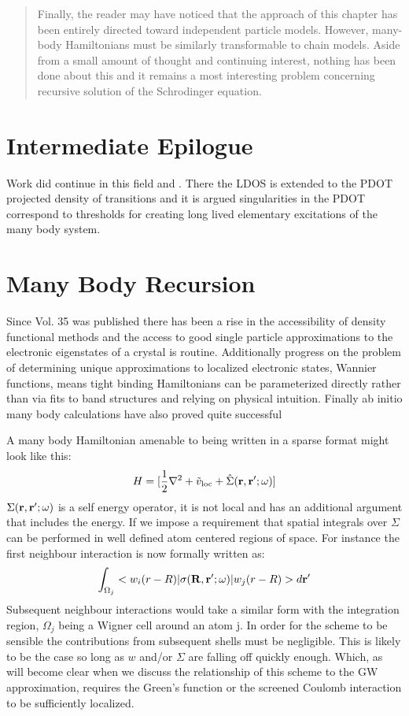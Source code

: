 \documentclass{article}
\def\r{{\bf r}}
\def\R{{\bf R}}
\begin{document}
\begin{quote}
Finally, the reader may have noticed that the approach of this chapter has been entirely directed
toward independent particle models. However, many-body Hamiltonians must be similarly 
transformable to chain models. Aside from a small amount of thought and continuing interest, 
nothing has been done about this and it remains a most interesting problem concerning recursive 
solution of the Schrodinger equation.
\end{quote}

\section{Intermediate Epilogue}
Work did continue in this field and \cite{annett94}. There the LDOS is extended
to the PDOT projected density of transitions and it is argued singularities
in the PDOT correspond to thresholds for creating long lived elementary excitations 
of the many body system.

\section{Many Body Recursion}
\label{sec:manybodyrecursion}
	Since Vol. 35 was published there has been a rise in the accessibility of density functional methods 
and the access to good single particle approximations to the electronic eigenstates of a crystal
is routine. Additionally progress on the problem of determining unique approximations to localized
electronic states, Wannier functions, means tight binding Hamiltonians can be parameterized directly
rather than via fits to band structures and relying on physical intuition. Finally ab initio many body
calculations have also proved quite successful

A many body Hamiltonian amenable to being written in a sparse format might look like this:
%
\begin{equation}
H = [\frac{1}{2}\nabla^{2} + \tilde{v}_{\rm loc} + \hat{\Sigma}(\r,\r';\omega)]
\end{equation}
%
	$\Sigma(\r,\r';\omega)$ is a self energy operator, it is not local and 
has an additional argument that includes the energy.
If we impose a requirement that spatial integrals over $\Sigma$ can be performed in 
well defined atom centered regions of space. For instance 
the first neighbour interaction is now formally written as: 
%
\begin{equation}
\int_{\Omega_{j}}<w_{i}(r-R)|\sigma(\R,\r';\omega)|w_{j}(r-R)>d\r'
\end{equation}
%
	Subsequent neighbour interactions would take a similar form
with the integration region, $\Omega_{j}$ being a Wigner cell around an 
atom j. In order for the scheme to be sensible the contributions from subsequent shells 
must be negligible. This is likely to be the case so long as $w$ and/or $\Sigma$ 
are falling off quickly enough. Which, as will become clear when we discuss
the relationship of this scheme to the GW approximation, requires 
the Green's function or the screened Coulomb interaction 
to be sufficiently localized.
\end{document}
